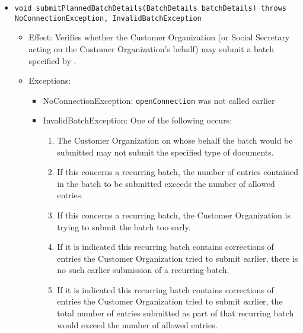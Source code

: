 \begin{itemize}
\begin{itemize}
	    \item \texttt{void submitPlannedBatchDetails(BatchDetails batchDetails) throws NoConnectionException, InvalidBatchException}
	         \begin{itemize}
	             \item Effect: Verifies whether the Customer Organization (or Social Secretary acting on the Customer Organization's behalf) may submit a batch specified by .
	             \item Exceptions:
	                \begin{itemize}
	                	\item NoConnectionException: \texttt{openConnection} was not called earlier
	                	\item InvalidBatchException: One of the following occurs:
	                	\begin{enumerate}
	                		\item The Customer Organization on whose behalf the batch would be submitted may not submit the specified type of documents.
		                	\item If this concerns a recurring batch, the number of entries contained in the batch to be submitted exceeds the number of allowed entries.
		                	\item If this concerns a recurring batch, the Customer Organization is trying to submit the batch too early.
		                	\item If it is indicated this recurring batch contains corrections of entries the Customer Organization tried to submit earlier, there is no such earlier submission of a recurring batch.
		                	\item If it is indicated this recurring batch contains corrections of entries the Customer Organization tried to submit earlier, the total number of entries submitted as part of that recurring batch would exceed the number of allowed entries.
	                	\end{enumerate}
	                \end{itemize}
	            \end{itemize}
	            

\end{itemize}
\end{itemize}
